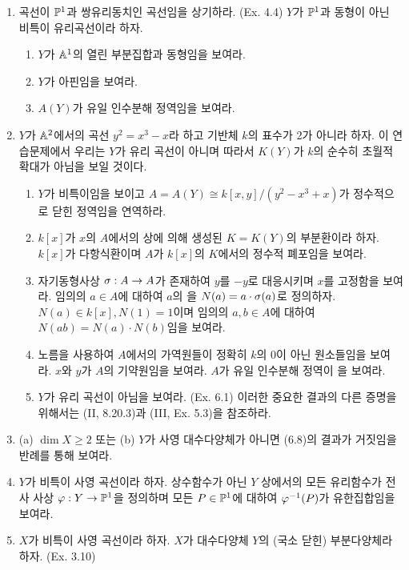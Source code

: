 	\begin{enumerate}[label=\tb{6.\arabic*.},itemindent=0mm,itemsep=2mm]
	\item {} 곡선이 $\mathbb{P}^1$과 쌍유리동치인 곡선임을 상기하라. (Ex. 4.4)
	$Y$가 $\mathbb{P}^1$과 동형이 아닌 비특이 유리곡선이라 하자.
	\begin{enumerate}[label=(\alph*)]
	\item $Y$가 $\mathbb{A}^1$의 열린 부분집합과 동형임을 보여라.
	\item $Y$가 아핀임을 보여라.
	\item $A(Y)$가 유일 인수분해 정역임을 보여라.
	\end{enumerate}
	\item {} $Y$가 $\mathbb{A}^2$에서의 곡선 $y^2=x^3-x$라 하고 기반체 $k$의 표수가 2가 아니라 하자.
	이 연습문제에서 우리는 $Y$가 유리 곡선이 아니며 따라서 $K(Y)$가 $k$의 순수히 초월적 확대가 아님을 보일 것이다.
	\begin{enumerate}[label=(\alph*)]
	\item $Y$가 비특이임을 보이고 $A=A(Y)\cong k[x,y]/(y^2-x^3+x)$가 정수적으로 닫힌 정역임을 연역하라.
	\item $k[x]$가 $x$의 $A$에서의 상에 의해 생성된 $K=K(Y)$의 부분환이라 하자.
	$k[x]$가 다항식환이며 $A$가 $k[x]$의 $K$에서의 정수적 폐포임을 보여라.
	\item 자기동형사상 $\sigma:A\rightarrow A$가 존재하여 $y$를 $-y$로 대응시키며 $x$를 고정함을 보여라.
	임의의 $a\in A$에 대하여 $a$의 을 $N(a)=a\cdot\sigma(a)$로 정의하자.
	$N(a)\in k[x],N(1)=1$이며 임의의 $a,b\in A$에 대하여 $N(ab)=N(a)\cdot N(b)$임을 보여라.
	\item 노름을 사용하여 $A$에서의 가역원들이 정확히 $k$의 0이 아닌 원소들임을 보여라.
	$x$와 $y$가 $A$의 기약원임을 보여라. $A$가 유일 인수분해 정역이 을 보여라.
	\item $Y$가 유리 곡선이 아님을 보여라. (Ex. 6.1)
	이러한 중요한 결과의 다른 증명을 위해서는 (II, 8.20.3)과 (III, Ex. 5.3)을 참조하라.
	\end{enumerate}
	\item (a) $\dim X\ge 2$ 또는 (b) $Y$가 사영 대수다양체가 아니면 (6.8)의 결과가 거짓임을 반례를 통해 보여라.
	\item $Y$가 비특이 사영 곡선이라 하자. 상수함수가 아닌 $Y$ 상에서의 모든 유리함수가 전사 사상 $\varphi:Y\rightarrow\mathbb{P}^1$을 정의하며
	모든 $P\in\mathbb{P}^1$에 대하여 $\varphi^{-1}(P)$가 유한집합임을 보여라.
	\item $X$가 비특이 사영 곡선이라 하자. $X$가 대수다양체 $Y$의 (국소 닫힌) 부분다양체라 하자. (Ex. 3.10)

\end{enumerate}
